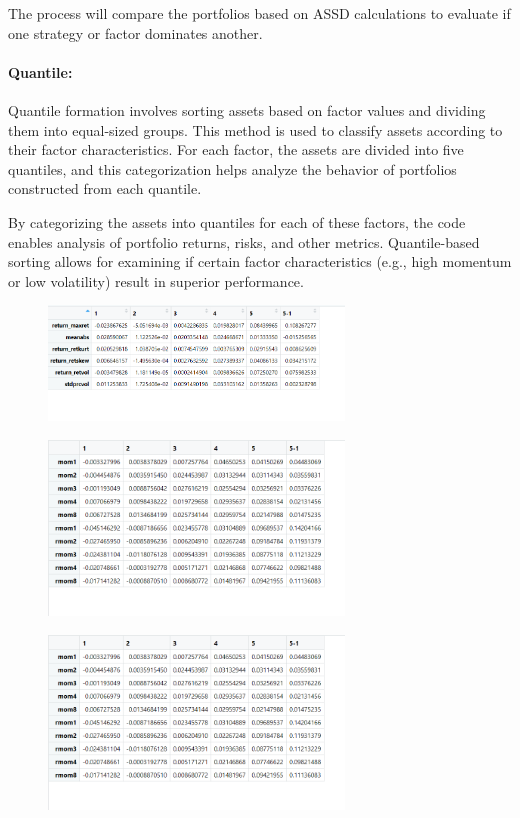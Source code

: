 \documentclass{article}
\begin{document}
The process will compare the portfolios based on ASSD calculations to evaluate if one strategy or factor dominates another.

\paragraph{Quantile:}
Quantile formation involves sorting assets based on factor values and dividing them into equal-sized groups. This method is used to classify assets according to their factor characteristics. For each factor, the assets are divided into five quantiles, and this categorization helps analyze the behavior of portfolios constructed from each quantile.

By categorizing the assets into quantiles for each of these factors, the code enables analysis of portfolio returns, risks, and other metrics. Quantile-based sorting allows for examining if certain factor characteristics (e.g., high momentum or low volatility) result in superior performance.
\begin{figure}[H]
    \centering
    \includegraphics[width=0.7\textwidth]{21.png}
    \label{fig:example}
\end{figure}
\begin{figure}[H]
    \centering
    \includegraphics[width=0.7\textwidth]{22.png}
    \label{fig:example}
\end{figure}
\begin{figure}[H]
    \centering
    \includegraphics[width=0.7\textwidth]{23.png}
    \label{fig:example}
\end{figure}
\end{document}
